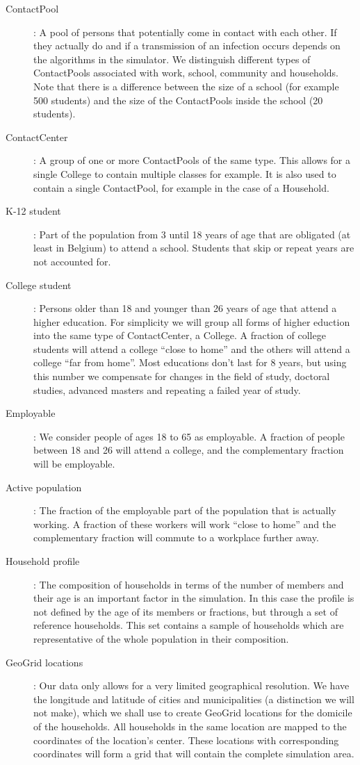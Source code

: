 \begin{description}
    \item[ContactPool]:
        A pool of persons that potentially come in contact with each other.
        If they actually do and if a transmission of an infection occurs depends on the algorithms in the simulator.
        We distinguish different types of ContactPools associated with work, school, community and households.
        Note that there is a difference between the size of a school (for example 500 students) and the size of the ContactPools inside the school (20 students).
    \item[ContactCenter]:
        A group of one or more ContactPools of the same type.
        This allows for a single College to contain multiple classes for example.
        It is also used to contain a single ContactPool, for example in the case of a Household.
    \item[K-12 student]: Part of the population from 3 until 18 years of age that are obligated (at least in Belgium) to attend a school. Students that skip or repeat years are not accounted for.
    \item[College student]:
        Persons older than 18 and younger than 26 years of age that attend a higher education. For simplicity we will group all forms of higher eduction into the same type of ContactCenter, a College. A fraction of college students will attend a college ``close to home'' and the others will attend a college ``far from home''.
        Most educations don't last for 8 years, but using this number we compensate for changes in the field of study, doctoral studies, advanced masters and repeating a failed year of study.
    \item[Employable]:
        We consider people of ages 18 to 65 as employable. A fraction of people between 18 and 26 will attend a college, and the complementary fraction will be employable.
    \item[Active population]:
        The fraction of the employable part of the population that is actually working. A fraction of these workers will work ``close to home'' and the complementary fraction will commute to a workplace further away.
    \item[Household profile]:
        The composition of households in terms of the number of members and their age is an important factor in the simulation. In this case the profile is not defined by the age of its members or fractions, but through a set of reference households. This set contains a sample of households which are representative of the whole population in their composition.
    \item[GeoGrid locations]:
        Our data only allows for a very limited geographical resolution. We have the longitude and latitude of cities and municipalities (a distinction we will not make), which we shall use to create GeoGrid locations for the domicile of the households.
        All households in the same location are mapped to the coordinates of the location's center. These locations with corresponding coordinates will form a grid that will contain the complete simulation area.
\end{description}

